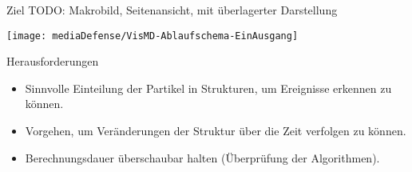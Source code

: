 \documentclass[10pt]{beamer}
\begin{document}
\begin{frame}{Ziel}
	TODO: Makrobild, Seitenansicht, mit überlagerter Darstellung
\end{frame}

\begin{wideframe}
	\texttt{[image: mediaDefense/VisMD-Ablaufschema-EinAusgang]}
\end{wideframe}

\begin{frame}{Herausforderungen}
	\begin{itemize}
		\item Sinnvolle Einteilung der Partikel in Strukturen, um Ereignisse erkennen zu können.
		\item Vorgehen, um Veränderungen der Struktur über die Zeit verfolgen zu können.
		\item Berechnungsdauer überschaubar halten (Überprüfung der Algorithmen).
	\end{itemize}
\end{frame}
\end{document}
